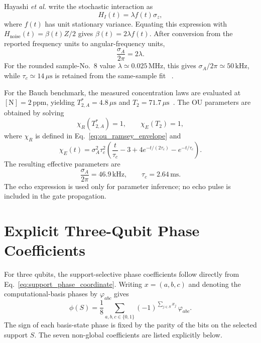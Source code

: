 \documentclass[
  aps,
  pra,
  reprint,            %
  superscriptaddress, %
  amsmath,amssymb,
  notitlepage
]{revtex4-2}
\begin{document}
Hayashi \emph{et al.} write the stochastic interaction as
\begin{equation}
H_I(t)=\lambda f(t)\sigma_z,
\end{equation}
where $f(t)$ has unit stationary variance. Equating this expression
with $H_{\mathrm{noise}}(t)=\beta(t)Z/2$ gives
$\beta(t)=2\lambda f(t)$. After conversion from the reported
frequency units to angular-frequency units,
\begin{equation}
\frac{\sigma_A}{2\pi}=2\lambda.
\end{equation}
For the rounded sample-No.~8 value
$\lambda\simeq0.025\,\mathrm{MHz}$, this gives
$\sigma_A/2\pi\simeq50\,\mathrm{kHz}$, while
$\tau_c\simeq14\,\mu\mathrm{s}$ is retained from the same-sample fit
~\cite{hayashi2020noise}.

For the Bauch benchmark, the measured concentration laws are
evaluated at $[\mathrm N]=2\,\mathrm{ppm}$, yielding
$T_{2,A}^{\ast}=4.8\,\mu\mathrm{s}$ and
$T_2=71.7\,\mu\mathrm{s}$~\cite{bauch2020decoherence}. The OU
parameters are obtained by solving
\begin{equation}
\chi_R(T_{2,A}^{\ast})=1,
\qquad
\chi_E(T_2)=1,
\end{equation}
where $\chi_R$ is defined in Eq.~\eqref{eq:ou_ramsey_envelope} and
\begin{equation}
\chi_E(t)
=
\sigma_A^2\tau_c^2
\left(
\frac{t}{\tau_c}-3
+4e^{-t/(2\tau_c)}
-e^{-t/\tau_c}
\right).
\end{equation}
The resulting effective parameters are
\begin{equation}
\frac{\sigma_A}{2\pi}=46.9\,\mathrm{kHz},
\qquad
\tau_c=2.64\,\mathrm{ms}.
\end{equation}
The echo expression is used only for parameter inference; no echo
pulse is included in the gate propagation.

\section{Explicit Three-Qubit Phase Coefficients}
\label{app:explicit_3q_invariants}

For three qubits, the support-selective phase coefficients follow directly from Eq.~\eqref{eq:support_phase_coordinate}. Writing $x=(a,b,c)$ and denoting the computational-basis phases by $\varphi_{abc}$ gives
\begin{equation}
\phi(S)
=
\frac{1}{8}
\sum_{a,b,c\in\{0,1\}}
(-1)^{\sum_{j\in S}x_j}\,\varphi_{abc}.
\label{eq:phiS_3q_general}
\end{equation}
The sign of each basis-state phase is fixed by the parity of the bits on the selected support $S$. The seven non-global coefficients are listed explicitly below.
\end{document}
